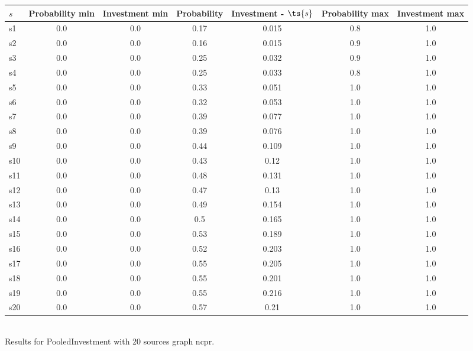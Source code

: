 \documentclass{article}
\begin{document}
\noindent\begin{tabular}{|l|c|c|c|c|c|c|}
\hline
$s$& Probability min & Investment min & Probability & Investment - $\ts{s}$ & Probability max & Investment max\\
\hline
s1 &0.0 & 0.0 & 0.17 & 0.015 & 0.8 & 1.0\\
\hline
s2 &0.0 & 0.0 & 0.16 & 0.015 & 0.9 & 1.0\\
\hline
s3 &0.0 & 0.0 & 0.25 & 0.032 & 0.9 & 1.0\\
\hline
s4 &0.0 & 0.0 & 0.25 & 0.033 & 0.8 & 1.0\\
\hline
s5 &0.0 & 0.0 & 0.33 & 0.051 & 1.0 & 1.0\\
\hline
s6 &0.0 & 0.0 & 0.32 & 0.053 & 1.0 & 1.0\\
\hline
s7 &0.0 & 0.0 & 0.39 & 0.077 & 1.0 & 1.0\\
\hline
s8 &0.0 & 0.0 & 0.39 & 0.076 & 1.0 & 1.0\\
\hline
s9 &0.0 & 0.0 & 0.44 & 0.109 & 1.0 & 1.0\\
\hline
s10 &0.0 & 0.0 & 0.43 & 0.12 & 1.0 & 1.0\\
\hline
s11 &0.0 & 0.0 & 0.48 & 0.131 & 1.0 & 1.0\\
\hline
s12 &0.0 & 0.0 & 0.47 & 0.13 & 1.0 & 1.0\\
\hline
s13 &0.0 & 0.0 & 0.49 & 0.154 & 1.0 & 1.0\\
\hline
s14 &0.0 & 0.0 & 0.5 & 0.165 & 1.0 & 1.0\\
\hline
s15 &0.0 & 0.0 & 0.53 & 0.189 & 1.0 & 1.0\\
\hline
s16 &0.0 & 0.0 & 0.52 & 0.203 & 1.0 & 1.0\\
\hline
s17 &0.0 & 0.0 & 0.55 & 0.205 & 1.0 & 1.0\\
\hline
s18 &0.0 & 0.0 & 0.55 & 0.201 & 1.0 & 1.0\\
\hline
s19 &0.0 & 0.0 & 0.55 & 0.216 & 1.0 & 1.0\\
\hline
s20 &0.0 & 0.0 & 0.57 & 0.21 & 1.0 & 1.0\\
\hline
\end{tabular}\\

\noindent Results for PooledInvestment with 20 sources graph ncpr.
\end{document}
